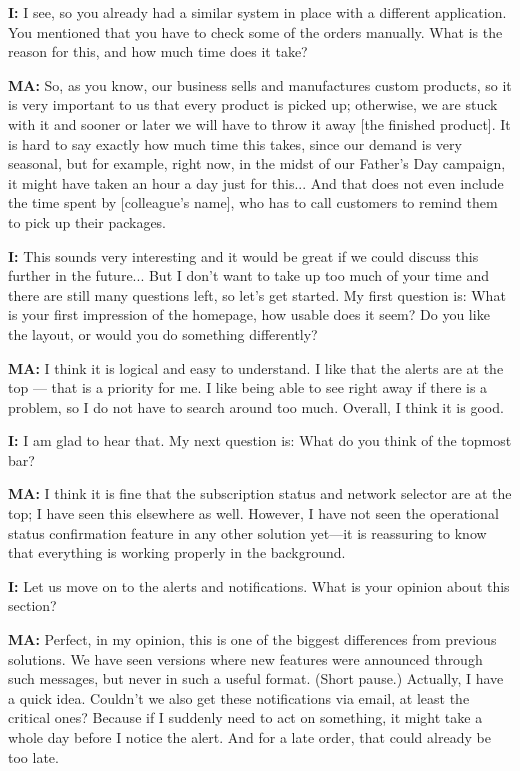 \documentclass{imc-inf}
\begin{document}
\begin{appendices}
  \noindent\textbf{I:} I see, so you already had a similar system in place with a different application. You mentioned that you have to check some of the orders manually. What is the reason for this, and how much time does it take?

  \noindent\textbf{MA:} So, as you know, our business sells and manufactures custom products, so it is very important to us that every product is picked up; otherwise, we are stuck with it and sooner or later we will have to throw it away [the finished product]. It is hard to say exactly how much time this takes, since our demand is very seasonal, but for example, right now, in the midst of our Father's Day campaign, it might have taken an hour a day just for this... And that does not even include the time spent by [colleague's name], who has to call customers to remind them to pick up their packages.

  \noindent\textbf{I:} This sounds very interesting and it would be great if we could discuss this further in the future... But I don't want to take up too much of your time and there are still many questions left, so let's get started. My first question is: What is your first impression of the homepage, how usable does it seem? Do you like the layout, or would you do something differently?

  \noindent\textbf{MA:} I think it is logical and easy to understand. I like that the alerts are at the top — that is a priority for me. I like being able to see right away if there is a problem, so I do not have to search around too much. Overall, I think it is good.

  \noindent\textbf{I:} I am glad to hear that. My next question is: What do you think of the topmost bar?

  \noindent\textbf{MA:} I think it is fine that the subscription status and network selector are at the top; I have seen this elsewhere as well. However, I have not seen the operational status confirmation feature in any other solution yet—it is reassuring to know that everything is working properly in the background.

  \noindent\textbf{I:} Let us move on to the alerts and notifications. What is your opinion about this section?

  \noindent\textbf{MA:} Perfect, in my opinion, this is one of the biggest differences from previous solutions. We have seen versions where new features were announced through such messages, but never in such a useful format. (Short pause.) Actually, I have a quick idea. Couldn't we also get these notifications via email, at least the critical ones? Because if I suddenly need to act on something, it might take a whole day before I notice the alert. And for a late order, that could already be too late.


\end{appendices}
\end{document}
